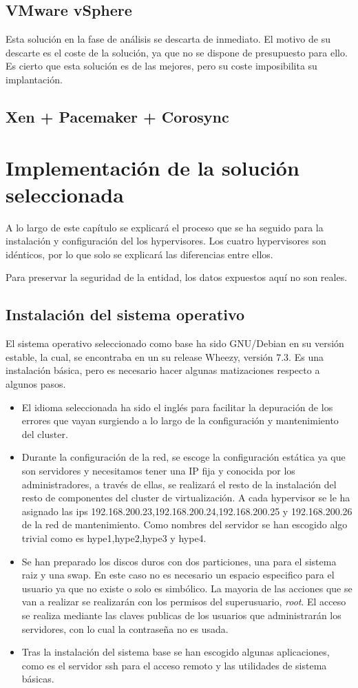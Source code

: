 \documentclass[12pt,a4paper,titlepage,twoside]{report}
\begin{document}
\section{VMware vSphere}

Esta solución en la fase de análisis se descarta de inmediato. El motivo de su descarte es el coste de la solución, ya que no se dispone de presupuesto para ello. Es cierto que esta solución es de las mejores, pero su coste imposibilita su implantación.
\section{Xen + Pacemaker + Corosync}

\chapter{Implementación de la solución seleccionada}
\par A lo largo de este capítulo se explicará el proceso que se ha seguido para la instalación y configuración del los hypervisores. Los cuatro hypervisores son idénticos, por lo que solo se explicará las diferencias entre ellos. 
\par Para preservar la seguridad de la entidad, los datos expuestos aquí no son reales.
\section{Instalación del sistema operativo}
El sistema operativo seleccionado como base ha sido GNU/Debian en su versión estable, la cual, se encontraba en un su release Wheezy, versión 7.3. Es una instalación básica, pero es necesario hacer algunas matizaciones respecto a algunos pasos.
\begin{itemize}
	\item El idioma seleccionada ha sido el inglés para facilitar la depuración de los errores que vayan surgiendo a lo largo de la configuración y mantenimiento del cluster.
	\item Durante la configuración de la red, se escoge la configuración estática ya que son servidores y necesitamos tener una IP fija y conocida por los administradores, a través de ellas, se realizará el resto de la instalación del resto de componentes del cluster de virtualización. A cada hypervisor se le ha asignado las ips 192.168.200.23,192.168.200.24,192.168.200.25 y 192.168.200.26 de la red de mantenimiento. Como nombres del servidor se han escogido algo trivial como es hype1,hype2,hype3 y hype4.
	\item Se han preparado los discos duros con dos particiones, una para el sistema raiz y una swap. En este caso no es necesario un espacio especifico para el usuario ya que no existe o solo es simbólico. La mayoria de las acciones que se van a realizar se realizarán con los permisos del superusuario, \textit{root}. El acceso se realiza mediante las claves publicas de los usuarios que administrarán los servidores, con lo cual la contraseña no es usada.
	\item Tras la instalación del sistema base se han escogido algunas aplicaciones, como es el servidor ssh para el acceso remoto y las utilidades de sistema básicas.
\end{itemize}
\end{document}
